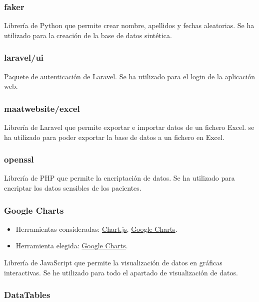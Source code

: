 \subsubsection{faker}

Librería de Python que permite crear nombre, apellidos y fechas aleatorias. Se ha utilizado para la creación de la base de datos sintética. 

\subsubsection{laravel/ui}

Paquete de autenticación de Laravel. Se ha utilizado para el login de la aplicación web.

\subsubsection{maatwebsite/excel}

Librería de Laravel que permite exportar e importar datos de un fichero Excel. se ha utilizado para poder exportar la base de datos a un fichero en Excel.

\subsubsection{openssl} \label{openssl}

Librería de PHP que permite la encriptación de datos. Se ha utilizado para encriptar los datos sensibles de los pacientes.

\subsubsection{Google Charts}
\begin{itemize}
    \item Herramientas consideradas: \href{https://www.chartjs.org/}{Chart.js}, \href{https://developers.google.com/chart}{Google Charts}.
	\item Herramienta elegida: \href{https://developers.google.com/chart}{Google Charts}.
\end{itemize}

Librería de JavaScript que permite la visualización de datos en gráficas interactivas. Se he utilizado para todo el apartado de visualización de datos.

\subsubsection{DataTables}

